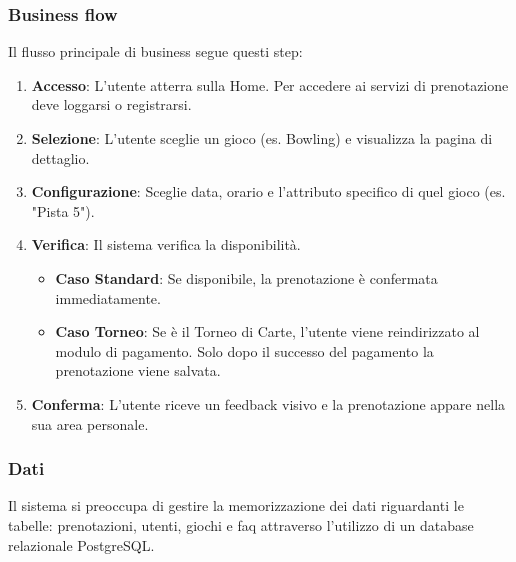 \documentclass[a4paper, twoside]{report}
\begin{document}
\subsubsection*{Business flow}
Il flusso principale di business segue questi step:
\begin{enumerate}
  \item \textbf{Accesso}: L'utente atterra sulla Home. Per accedere ai servizi di prenotazione deve loggarsi o registrarsi.
  \item \textbf{Selezione}: L'utente sceglie un gioco (es. Bowling) e visualizza la pagina di dettaglio.
  \item \textbf{Configurazione}: Sceglie data, orario e l’attributo specifico di quel gioco (es. "Pista 5").
  \item \textbf{Verifica}: Il sistema verifica la disponibilità.
  \begin{itemize}
    \item \textbf{Caso Standard}: Se disponibile, la prenotazione è confermata immediatamente.
    \item \textbf{Caso Torneo}: Se è il Torneo di Carte, l'utente viene reindirizzato al modulo di pagamento. Solo dopo il successo del pagamento la prenotazione viene salvata.
  \end{itemize}
  \item \textbf{Conferma}: L'utente riceve un feedback visivo e la prenotazione appare nella sua area personale.
\end{enumerate}
\subsubsection*{Dati}
Il sistema si preoccupa di gestire la memorizzazione dei dati riguardanti le tabelle: prenotazioni, utenti, giochi e faq attraverso l’utilizzo di un database relazionale PostgreSQL.
\end{document}
